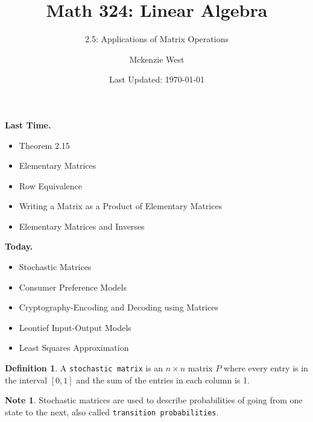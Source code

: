 \documentclass[handout]{beamer}
\newcommand{\fn}{\insertframenumber}
\theoremstyle{definition}
\newtheorem*{defn}{Definition}
\newtheorem*{nb}{Note}
\renewcommand{\emph}[1]{{\color{blue}\texttt{#1}}}
\begin{document}
	\title{Math 324: Linear Algebra}
	\subtitle{2.5: Applications of Matrix Operations}
	\author{Mckenzie West}
	\date{Last Updated: \today}
\begin{frame}
\maketitle
\end{frame}

\begin{frame}{\insertframenumber}
	\begin{block}{\textbf{Last Time.}}
	\begin{itemize}[label=--]
		\item Theorem 2.15
		\item Elementary Matrices
		\item Row Equivalence
		\item Writing a Matrix as a Product of Elementary Matrices
		\item Elementary Matrices and Inverses
	\end{itemize}
	\end{block}
\begin{block}{\textbf{Today.}}
	\begin{itemize}[label=--]
		\item Stochastic Matrices
		\item Consumer Preference Models
		\item Cryptography-Encoding and Decoding using Matrices
		\item Leontief Input-Output Models
		\item Least Squares Approximation
	\end{itemize}
\end{block}
\end{frame}


\begin{frame}{\fn}
	\begin{defn}
		A \emph{stochastic matrix} is an $n\times n$ matrix $P$ where every entry is in the interval $[0,1]$ and the sum of the entries in each column is 1.
	\end{defn}

	\begin{nb}
		Stochastic matrices are used to describe probabilities of going from one state to the next, also called \emph{transition probabilities}.
	\end{nb}
\end{frame}
\end{document}
